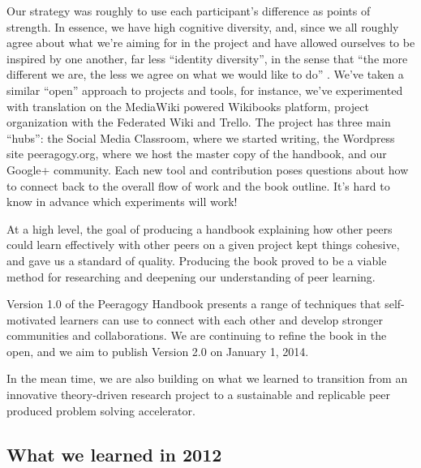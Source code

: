 \documentclass{acm_proc_article-sp}
\begin{document}
Our strategy was roughly to use each participant's difference as
points of strength.  In essence, we have high cognitive diversity,
and, since we all roughly agree about what we're aiming for in the
project and have allowed ourselves to be inspired by one another, far
less ``identity diversity'', in the sense that ``the more different we
are, the less we agree on what we would like to do''
\cite{Page2008difference}.  We've taken a similar ``open'' approach to
projects and tools, for instance, we've experimented with translation
on the MediaWiki powered Wikibooks platform, project organization with
the Federated Wiki and Trello.  The project has three main ``hubs'':
the Social Media Classroom, where we started writing, the Wordpress
site peeragogy.org, where we host the master copy of the handbook, and
our Google+ community.  Each new tool and contribution poses questions
about how to connect back to the overall flow of work and the book
outline.  It's hard to know in advance which experiments will work!

At a high level, the goal of producing a handbook explaining how other
peers could learn effectively with other peers on a given project kept
things cohesive, and gave us a standard of quality.  Producing the
book proved to be a viable method for researching and deepening our
understanding of peer learning.

Version 1.0 of the Peeragogy Handbook presents a range of techniques
that self-motivated learners can use to connect with each other and
develop stronger communities and collaborations.  We are continuing to
refine the book in the open, and we aim to publish Version 2.0 on
January 1, 2014.

In the mean time, we are also building on what we learned to
transition from an innovative theory-driven research project to a
sustainable and replicable peer produced problem solving accelerator.

\subsection{What we learned in 2012}
\end{document}
